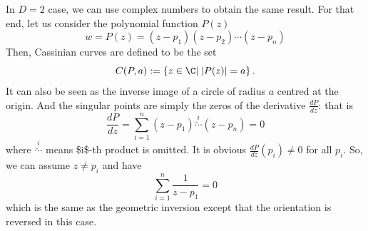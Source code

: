 \documentclass{article}
\begin{document}
In \(D=2\) case, we can use complex numbers to obtain the same result. For that end, let us consider the polynomial function \(P(z)\)
\begin{equation}
\label{}
w = P(z) = (z-p_1)(z-p_2)\cdots(z-p_n)
\end{equation}
Then, Cassinian curves are defined to be the set
\begin{equation}
\label{ }
C(P,a) := \left\{ z \in \C | \;|P(z)| = a \right\}.
\end{equation}
It can also be seen as the inverse image of a circle of radius \(a\) centred at the origin. And the singular points are simply the zeros of the derivative \(\frac{dP}{dz}\): that is
\begin{equation}
\label{ }
\frac{dP}{dz} = \sum_{i=1}^{n} (z-p_1)\overset{i}{\breve{\cdots} }(z-p_n) = 0
\end{equation}
where \(\overset{i}{\breve{\cdots} }\) means \$i\$-th product is omitted. It is obvious \(\frac{dP}{dz}(p_i) \ne 0\) for all \(p_i\). So, we can assume \(z \ne p_i\) and have
\begin{equation}
\label{ }
\sum_{i=1}^{n} \frac{1}{z-p_1} = 0
\end{equation}
which is the same as the geometric inversion except that the orientation is reversed in this case.
\end{document}
